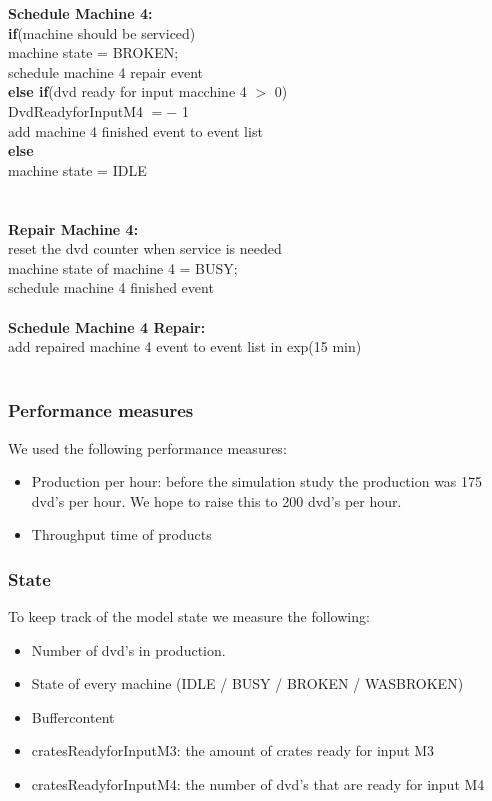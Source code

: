 \documentclass[11pt,a4paper]{article}
\newcommand{\tab}{\hspace*{2em}}
\begin{document}
\noindent \textbf{Schedule Machine 4:} \textbraceleft\\ 
	\tab \textbf{if}(machine should be serviced) \textbraceleft \\
	\tab \tab machine state = BROKEN; \\
	\tab \tab schedule machine 4 repair event \\
	\tab \textbraceright \textbf{else if}(dvd ready for input macchine 4 $>$ 0) \textbraceleft \\
	\tab \tab DvdReadyforInputM4 $=-$ 1 \\
	\tab \tab add machine 4 finished event to event list \\
	\tab \textbraceright \textbf{else} \textbraceleft \\
	\tab \tab machine state = IDLE \\
	\tab \textbraceright \\
\textbraceright \\

\noindent \textbf{Repair Machine 4:} \textbraceleft\\ 
	\tab reset the dvd counter when service is needed \\
	\tab machine state of machine 4 = BUSY; \\
	\tab schedule machine 4 finished event \\
\textbraceright \\

\noindent \textbf{Schedule Machine 4 Repair:} \textbraceleft\\ 
	\tab add repaired machine 4 event to event list in exp(15 min) \\
\textbraceright \\


	

\subsubsection{Performance measures}
We used the following performance measures:
\begin{itemize}
\item Production per hour: before the simulation study the production was 175 dvd's per hour. We hope to raise this to 200 dvd's per hour. 
\item Throughput time of products 
\end {itemize}


\subsubsection{State}
To keep track of the model state we measure the following:
\begin{itemize}
\item Number of dvd's in production.
\item State of every machine (IDLE / BUSY / BROKEN / WASBROKEN)
\item Buffercontent
\item cratesReadyforInputM3: the amount of crates ready for input M3
\item cratesReadyforInputM4: the number of dvd's that are ready for input M4
\end{itemize}
\end{document}
